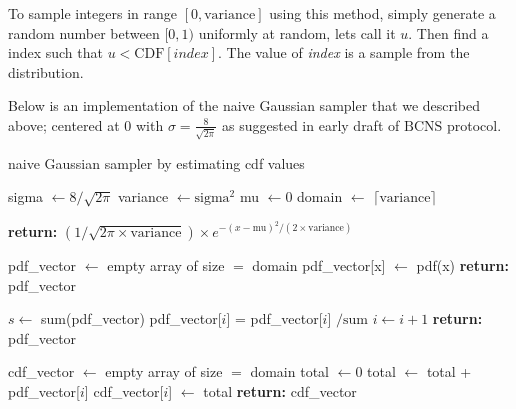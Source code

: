 To sample integers in range $[0, \text{variance}]$ using this method, simply generate a random number between $[0, 1)$ uniformly at random, lets call it $u$. Then find a index such that $u < \mathrm{CDF}[index]$. The value of \textit{index} is a sample from the distribution.

Below is an implementation of the naive Gaussian sampler that we described above; centered at $0$ with $\sigma = \frac{8}{\sqrt{2  \pi}}$ as suggested in early draft of $\mathrm{BCNS}$ protocol.



\begin{algorithm}[H]
    \caption{naive Gaussian sampler by estimating cdf values}
    \begin{algorithmic}[1]
        \State sigma $\gets 8 / \sqrt{2  \pi}$ 
        \State variance $\gets \text{sigma}^2$
        \State mu $\gets 0$
        \State domain $\gets$ $\lceil\text{variance}\rceil$
        \item[] 
            \State \textbf{return:} $(1/\sqrt{2 \pi \times \text{variance}}) \times e^{-{(x - \text{mu})}^2 / (2 \times \text{variance})}$
        \EndFunction
        \item[] 
        \item[] 
            \State pdf\_vector $\gets$ empty array of size $=$ domain
                \State pdf\_vector[x] $\gets$ pdf(x)
            \EndFor
            \State \textbf{return:} pdf\_vector
        \EndFunction
        \item[] 
            \State $s \gets$ sum(pdf\_vector)
                \State pdf\_vector[$i$] = pdf\_vector[$i$] $/ \text{sum}$ 
                \State $i \gets i + 1$
            \EndFor
            \State \textbf{return:} pdf\_vector
        \EndFunction
        \item[] 
            \State cdf\_vector $\gets$ empty array of size $=$ domain
            \State total $\gets 0$
                \State total $\gets$ total + pdf\_vector[$i$]
                \State cdf\_vector[$i$] $\gets$ total
            \EndFor
            \State \textbf{return:} cdf\_vector
        \EndFunction
    \end{algorithmic}
\end{algorithm}

